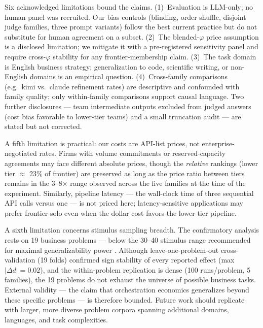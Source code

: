 \documentclass[12pt,a4paper]{article}
\newcommand{\phiBlend}{\varphi}
\begin{document}
Six acknowledged limitations bound the claims. (1)~Evaluation is LLM-only; no
human panel was recruited. Our bias controls (blinding, order shuffle, disjoint
judge families, three prompt variants) follow the best current practice
\citep{ZhengEtAl2023, VergaEtAl2024} but do not substitute for human agreement
on a subset. (2)~The blended-$\phiBlend$ price assumption is a disclosed
limitation; we mitigate it with a pre-registered sensitivity panel and require
cross-$\phiBlend$ stability for any frontier-membership claim. (3)~The task
domain is English business strategy; generalization to code, scientific writing,
or non-English domains is an empirical question. (4)~Cross-family comparisons
(e.g.\ kimi vs.\ claude refinement rates) are descriptive and confounded with
family quality; only within-family comparisons support causal language. Two
further disclosures --- team intermediate outputs excluded from judged answers
(cost bias favorable to lower-tier teams) and a small truncation audit --- are stated
but not corrected.

A fifth limitation is practical: our costs are API-list prices, not
enterprise-negotiated rates. Firms with volume commitments or reserved-capacity
agreements may face different absolute prices, though the \emph{relative}
rankings (lower tier $\approx$ 23\% of frontier) are preserved as long as the
price ratio between tiers remains in the 3--8$\times$ range observed across the
five families at the time of the experiment. Similarly, pipeline latency --- the
wall-clock time of three sequential API calls versus one --- is not priced here;
latency-sensitive applications may prefer frontier solo even when the dollar
cost favors the lower-tier pipeline.

A sixth limitation concerns stimulus sampling breadth. The confirmatory
analysis rests on 19 business problems --- below the 30--40 stimulus range
recommended for maximal generalizability power \citep{WestfallKennyJudd2014}.
Although leave-one-problem-out cross-validation (19 folds)
confirmed sign stability of every reported effect (max $|\Delta d| = 0.02$),
and the within-problem replication is dense (100 runs/problem, 5
families), the 19 problems do not exhaust the universe of possible
business tasks. External validity --- the claim that orchestration
economics generalizes beyond these specific problems --- is therefore
bounded. Future work should replicate with larger, more diverse problem
corpora spanning additional domains, languages, and task complexities.
\end{document}
